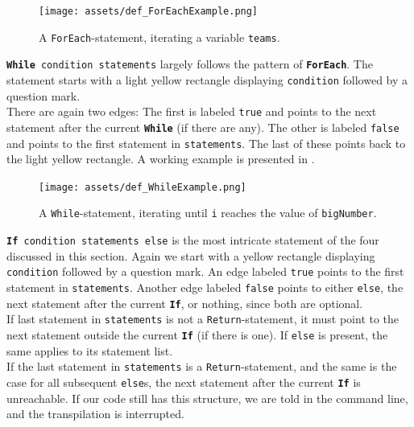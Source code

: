 \begin{figure}[ht]
    \centering
    \texttt{[image: assets/def\_ForEachExample.png]}
    \caption{A \texttt{ForEach}-statement, iterating a variable \texttt{teams}.}
    \label{flochartForEach}
\end{figure}

\texttt{\textbf{While} condition statements} largely follows the pattern of \texttt{\textbf{ForEach}}. The statement starts with a light yellow rectangle displaying \texttt{condition} followed by a question mark. \\

There are again two edges: The first is labeled \texttt{true} and points to the next statement after the current \texttt{\textbf{While}} (if there are any). The other is labeled \texttt{false} and points to the first statement in \texttt{statements}. The last of these points back to the light yellow rectangle. A working example is presented in . \\

\begin{figure}[ht]
    \centering
    \texttt{[image: assets/def\_WhileExample.png]}
    \caption{A \texttt{While}-statement, iterating until \texttt{i} reaches the value of \texttt{bigNumber}.}
    \label{flochartWhile}
\end{figure}

\texttt{\textbf{If} condition statements else} is the most intricate statement of the four discussed in this section. Again we start with a yellow rectangle displaying \texttt{condition} followed by a question mark. An edge labeled \texttt{true} points to the first statement in \texttt{statements}. Another edge labeled \texttt{false} points to either \texttt{else}, the next statement after the current \texttt{\textbf{If}}, or nothing, since both are optional. \\

If last statement in \texttt{statements} is not a \texttt{Return}-statement, it must point to the next statement outside the current \texttt{\textbf{If}} (if there is one). If \texttt{else} is present, the same applies to its statement list. \\

If the last statement in \texttt{statements} is a \texttt{Return}-statement, and the same is the case for all subsequent \texttt{else}s, the next statement after the current \texttt{\textbf{If}} is unreachable. If our code still has this structure, we are told in the command line, and the transpilation is interrupted. \\

